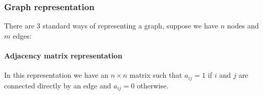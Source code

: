 \documentclass{book}
\begin{document}
\subsubsection{Graph representation}
\hypertarget{/program/main/process/graph}{}
There are 3 standard ways of representing a graph, suppose we have $n$ nodes and $m$ edges: 
\paragraph{Adjacency matrix representation} 
In this representation we have an $n \times n$ matrix such that $a_{ij} = 1$ if $i$ and $j$ are connected directly by an edge and $a_{ij} = 0$ otherwise. 
\end{document}
